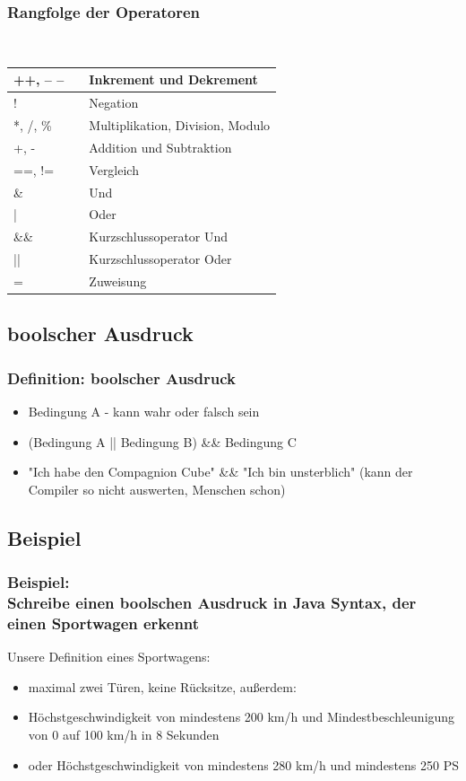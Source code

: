 \documentclass[final]{beamer}
\begin{document}
\begin{frame}
	\frametitle{Rangfolge der Operatoren}
	\\
	\begin{center}
	\begin{tabular}{|l c | l|}
	 \hline
		++, -- --  & &  Inkrement und Dekrement \\
		 \hline
		! & & Negation \\ \hline
		
		*, /, \% & & Multiplikation, Division, Modulo \\ \hline
		+, - & & Addition und Subtraktion \\ \hline
		==, != & & Vergleich \\ \hline
		\& & & Und \\ \hline
		| & & Oder \\ \hline
		\&\& & & Kurzschlussoperator Und \\ \hline
		|| & & Kurzschlussoperator Oder \\ \hline
		= & & Zuweisung \\
		 \hline
	\end{tabular}
	\end{center}
\end{frame}

\subsection{boolscher Ausdruck} 
\begin{frame}
	\frametitle{Definition: boolscher Ausdruck}
	\begin{itemize}
		\item{Bedingung A - kann wahr oder falsch sein}
		\item{(Bedingung A || Bedingung B) \&\& Bedingung C}
		\item{"Ich habe den Compagnion Cube" \&\& "Ich bin unsterblich" (kann der Compiler so nicht auswerten, Menschen schon)}
	\end{itemize}
\end{frame}

\subsection{Beispiel}
\begin{frame}
	\frametitle{Beispiel: \\Schreibe einen boolschen Ausdruck in Java Syntax, der einen Sportwagen erkennt}
	Unsere Definition eines Sportwagens:	\\
	\begin{itemize}
		\item{maximal zwei Türen, keine Rücksitze, außerdem:}
		\item{Höchstgeschwindigkeit von mindestens 200 km/h und  Mindestbeschleunigung von 0 auf 100 km/h in 8 Sekunden}
		\item{oder Höchstgeschwindigkeit von mindestens 280 km/h und mindestens 250 PS}
	\end{itemize}
\end{frame}
\end{document}
